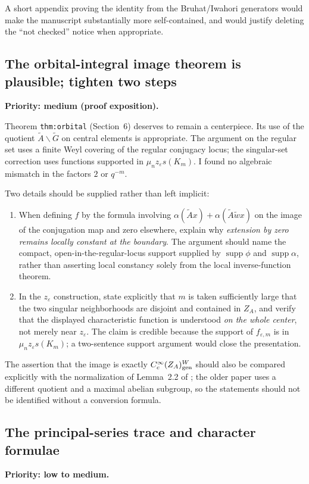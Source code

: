 \documentclass[12pt,letterpaper]{article}
\newcommand{\Gt}{\widetilde G}
\newcommand{\At}{\widetilde A}
\newcommand{\ZA}{Z_A}
\newcommand{\eps}{\varepsilon}
\begin{document}
A short appendix proving the identity from the Bruhat/Iwahori generators would make the manuscript substantially more self-contained, and would justify deleting the ``not checked'' notice when appropriate.

\subsection{The orbital-integral image theorem is plausible; tighten two steps}
\textbf{Priority: medium (proof exposition).}

Theorem \texttt{thm:orbital} (Section~6) deserves to remain a centerpiece. Its use of the quotient $\At\backslash\Gt$ on central elements is appropriate. The argument on the regular set uses a finite Weyl covering of the regular conjugacy locus; the singular-set correction uses functions supported in $\mu_n z_{\eps}s(K_m)$. I found no algebraic mismatch in the factors $2$ or $q^{-m}$.

Two details should be supplied rather than left implicit:
\begin{enumerate}
\item When defining $f$ by the formula involving
$\alpha(\At x)+\alpha(\At\widetilde w x)$ on the image of the conjugation map and zero elsewhere, explain why \emph{extension by zero remains locally constant at the boundary}. The argument should name the compact, open-in-the-regular-locus support supplied by $\operatorname{supp}\phi$ and $\operatorname{supp}\alpha$, rather than asserting local constancy solely from the local inverse-function theorem.
\item In the $z_{\eps}$ construction, state explicitly that $m$ is taken sufficiently large that the two singular neighborhoods are disjoint and contained in $\ZA$, and verify that the displayed characteristic function is understood \emph{on the whole center}, not merely near $z_{\eps}$. The claim is credible because the support of $f_{\eps,m}$ is in $\mu_n z_{\eps}s(K_m)$; a two-sentence support argument would close the presentation.
\end{enumerate}

The assertion that the image is exactly $C_c^\infty(\ZA)_{\rm gen}^W$ should also be compared explicitly with the normalization of Lemma~2.2 of \cite{Jo01}; the older paper uses a different quotient and a maximal abelian subgroup, so the statements should not be identified without a conversion formula.

\subsection{The principal-series trace and character formulae}
\textbf{Priority: low to medium.}
\end{document}

